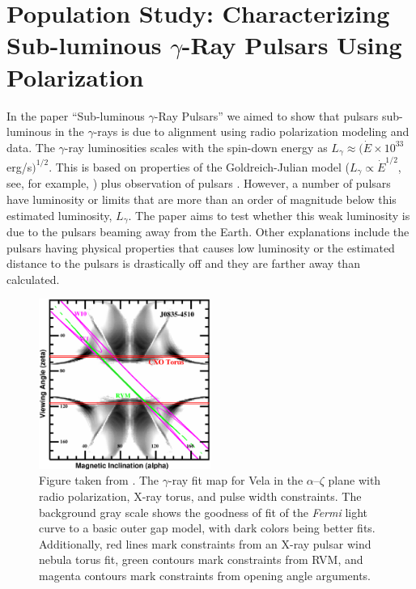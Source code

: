 \section{Population Study: Characterizing Sub-luminous $\gamma$-Ray Pulsars Using Polarization}


In the paper ``Sub-luminous $\gamma$-Ray Pulsars'' \citep{romani2011sub} we aimed
to show that pulsars sub-luminous in the $\gamma$-rays
is due to alignment using radio polarization modeling
and data.
The $\gamma$-ray luminosities scales with the spin-down energy as
$L_{\gamma}\approx(\dot{E}\times 10^{33} $ erg/s$)^{1/2}$.
This is based on properties of the Goldreich-Julian model
($L_{\gamma}\propto\dot{E}^{1/2}$, see, for example, \cite{lyne2006pulsar})
plus observation of pulsars \citep{psrcat}.
However, a number of pulsars have luminosity or limits 
that are more than an order of magnitude below this
estimated luminosity, $L_{\gamma}$.
The paper aims to test whether this weak luminosity 
is due to the pulsars beaming away from the Earth.
Other explanations include the pulsars having physical
properties that causes low luminosity or the estimated distance
to the pulsars is drastically off and they are farther away 
than calculated.

\begin{figure}[t!!]
\begin{center}
\includegraphics[width=0.5\textwidth]{chapters/multiWaveLength/figures/f2.eps}
\caption[The $\gamma$-ray fit map for Vela in the $\alpha$--$\zeta$ plane with radio polarization, X-ray torus, and pulse width constraints]{
\label{VelaEx} 
Figure taken from \cite{romani2011sub}.
The $\gamma$-ray fit map for Vela in the $\alpha$--$\zeta$ plane with radio polarization, X-ray torus, and pulse width constraints.
The background gray scale shows the goodness of fit of the {\it Fermi} light curve to a
basic outer gap model, with dark colors being better fits. Additionally, red lines mark
constraints from an X-ray pulsar wind nebula torus fit, green contours mark constraints
from RVM, and magenta contours mark constraints from opening angle arguments.
}
\end{center}
\end{figure}


